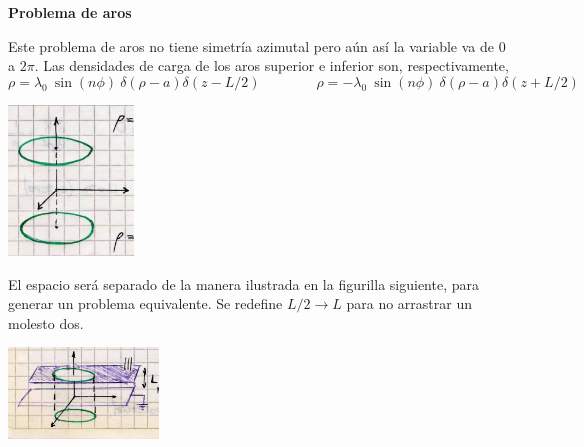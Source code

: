 \documentclass[10pt,oneside]{CBFT_book}
\begin{document}
\begin{ejemplo}{\bf Problema de aros}

Este problema de aros no tiene simetría azimutal pero aún así la variable va de $0$ a $2\pi$.
Las densidades de carga de los aros superior e inferior son, respectivamente,
\[
	\rho = \lambda_0 \: \sin (n\phi) \: \delta(\rho-a) \delta(z-L/2)
	\qquad \qquad
	\rho = -\lambda_0 \: \sin (n\phi) \: \delta(\rho-a) \delta(z+L/2)
\]

\includegraphics[width=0.25\textwidth]{images/fig_ft1_cilindricasB.jpg} 


El espacio será separado de la manera ilustrada en la figurilla siguiente, para generar un
problema equivalente. Se redefine $L/2 \to L$ para no arrastrar un molesto dos.

\includegraphics[width=0.3\textwidth]{images/fig_ft1_cilindricasC.jpg} 
 

\end{ejemplo}
\end{document}
